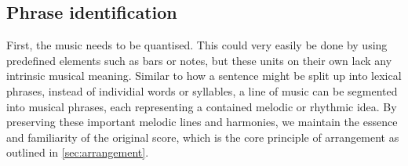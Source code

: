 \documentclass[12pt]{article}
\theoremstyle{definition}
\begin{document}

\subsection{Phrase identification}

First, the music needs to be quantised. This could very easily be done by using predefined elements such as bars or notes, but these units on their own lack any intrinsic musical meaning. Similar to how a sentence might be split up into lexical phrases, instead of individial words or syllables, a line of music can be segmented into musical phrases, each representing a contained melodic or rhythmic idea. By preserving these important melodic lines and harmonies, we maintain the essence and familiarity of the original score, which is the core principle of arrangement as outlined in \cref{sec:arrangement}.
\end{document}
